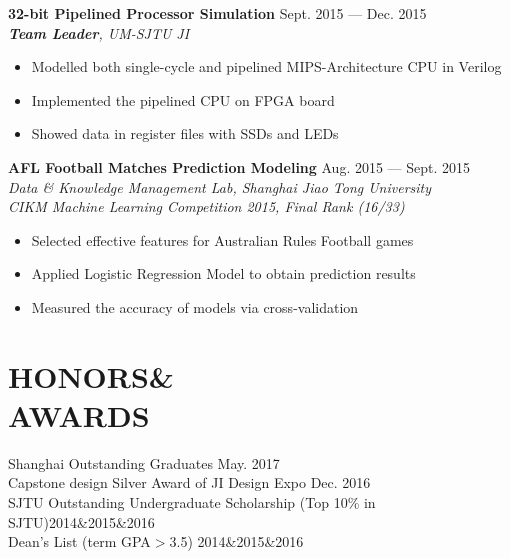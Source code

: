\documentclass[margin,line,10pt]{res}
\begin{document}
\begin{resume}
{
\small
{\bf 32-bit Pipelined Processor Simulation} \hfill Sept. 2015 --- Dec. 2015\\
{\it \textbf{Team Leader}, UM-SJTU JI}
}
\begin{itemize}
\setlength{\itemsep}{0pt}
\setlength{\parskip}{0pt}
\setlength{\parsep}{0pt}
\item {\small Modelled both single-cycle and pipelined MIPS-Architecture CPU in Verilog}
\item {\small Implemented the pipelined CPU on FPGA board}
\item {\small Showed data in register files with SSDs and LEDs}
\end{itemize}
{
\small
{\bf AFL Football Matches Prediction Modeling} \hfill Aug. 2015 --- Sept. 2015\\
{\it Data \& Knowledge Management Lab, Shanghai Jiao Tong University \\ CIKM Machine Learning Competition 2015, Final Rank (16/33)}
}
\begin{itemize}
\setlength{\itemsep}{0pt}
\setlength{\parskip}{0pt}
\setlength{\parsep}{0pt}
\item {\small Selected effective features for Australian Rules Football games}
\item {\small Applied Logistic Regression Model to obtain prediction results}
\item {\small Measured the accuracy of models via cross-validation}
\end{itemize}

\section{HONORS\&\\AWARDS}
{
\small
Shanghai Outstanding Graduates \hfill May. 2017\\
Capstone design Silver Award of JI Design Expo \hfill Dec. 2016\\
SJTU Outstanding Undergraduate Scholarship {(Top 10\% in SJTU)}\hfill2014\&2015\&2016\\
Dean's List {(term GPA$>$3.5)} \hfill2014\&2015\&2016\\
}



\end{resume}
\end{document}
